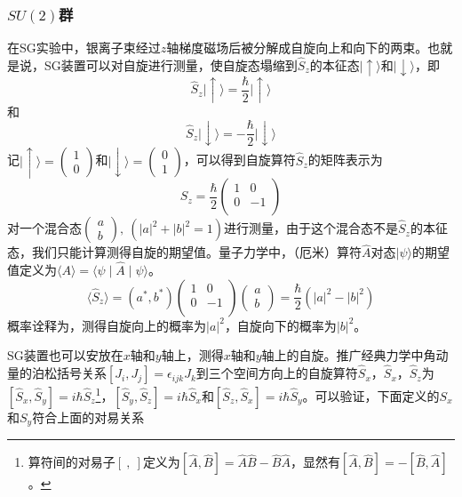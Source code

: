 \documentclass[a4paper,11pt]{ctexart}
\newcommand{\beq}{\begin{equation}}
\newcommand{\eeq}{\end{equation}}
\newcommand{\up}{\uparrow}
\newcommand{\down}{\downarrow}
\begin{document}
\subsubsection{$SU(2)$群}
在SG实验中，银离子束经过$z$轴梯度磁场后被分解成自旋向上和向下的两束。也就是说，SG装置可以对自旋进行测量，使自旋态塌缩到$\hat{S}_z$的本征态$\mid \up \rangle$和$\mid \down \rangle$，即
\beq
\hat{S}_z \mid \up \rangle = \frac{\hbar}{2} \mid \up \rangle
\eeq
和
\beq
\hat{S}_z \mid \down \rangle = -\frac{\hbar}{2} \mid \down \rangle
\eeq
记$\mid \up \rangle = \begin{pmatrix} 1 \\ 0 \end{pmatrix} $和$\mid \down \rangle = \begin{pmatrix} 0 \\ 1 \end{pmatrix} $，可以得到自旋算符$\hat{S}_z$的矩阵表示为
\beq
S_z = \frac{\hbar}{2} 
\begin{pmatrix}
 1 & 0 \\
 0 & -1 \\
\end{pmatrix}
\eeq
对一个混合态$\begin{pmatrix} a \\ b \end{pmatrix}, \ (|a|^2 + |b|^2 = 1)$进行测量，由于这个混合态不是$\hat{S}_z$的本征态，我们只能计算测得自旋的期望值。量子力学中，（厄米）算符$\hat{A}$对态$\mid \psi \rangle$的期望值定义为$\langle A \rangle = \langle \psi \mid \hat{A} \mid \psi \rangle$。
\beq
\langle \hat{S}_z \rangle = (a^*,b^*) \begin{pmatrix}
 1 & 0 \\
 0 & -1 \\
\end{pmatrix}
\begin{pmatrix} a \\ b \end{pmatrix}
= \frac{\hbar}{2} (|a|^2 - |b|^2)
\eeq
概率诠释为，测得自旋向上的概率为$|a|^2$，自旋向下的概率为$|b|^2$。\par
SG装置也可以安放在$x$轴和$y$轴上，测得$x$轴和$y$轴上的自旋。推广经典力学中角动量的泊松括号关系$[J_i,J_j] = \epsilon_{ijk} J_k$到三个空间方向上的自旋算符$\hat{S}_x$，$\hat{S}_x$，$\hat{S}_z$为$[\hat{S}_x,\hat{S}_y] = i\hbar \hat{S}_z$\footnote{算符间的对易子$[\ ,\ ]$定义为$[\hat{A},\hat{B}] = \hat{A} \hat{B} - \hat{B} \hat{A}$，显然有$[\hat{A},\hat{B}] = - [\hat{B},\hat{A}]$。}，$[\hat{S}_y,\hat{S}_z] = i\hbar \hat{S}_x$和$[\hat{S}_z,\hat{S}_x] = i\hbar \hat{S}_y$。可以验证，下面定义的$S_x$和$S_y$符合上面的对易关系
\end{document}
